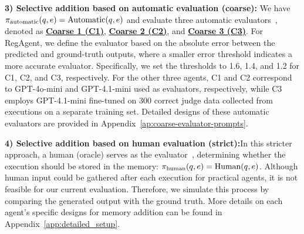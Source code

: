 \documentclass[11pt]{article}
\theoremstyle{plain}
\theoremstyle{definition}
\begin{document}
\textbf{3) Selective addition based on automatic evaluation (coarse):}
{
We have \(\pi_{\rm automatic}(q, e) = \text{Automatic}(q, e)\) and evaluate three automatic evaluators~\citep{wang2024agent,yin2024explicit,liang2024self}, denoted as \underline{\textbf{Coarse 1 (C1)}}, \underline{\textbf{Coarse 2 (C2)}}, and \underline{\textbf{Coarse 3 (C3)}}.
For RegAgent, we define the evaluator based on the absolute error between the predicted and ground-truth outputs, where a smaller error threshold indicates a more accurate evaluator.
Specifically, we set the thresholds to 1.6, 1.4, and 1.2 for C1, C2, and C3, respectively.
For the other three agents, C1 and C2 correspond to GPT-4o-mini and GPT-4.1-mini used as evaluators, respectively, while C3 employs GPT-4.1-mini fine-tuned on 300 correct judge data collected from executions on a separate training set.
}
Detailed designs of these automatic evaluators are provided in Appendix~\ref{ap:coarse-evaluator-prompts}.

\textbf{4) Selective addition based on human evaluation (strict):}In this stricter approach, a human (oracle) serves as the evaluator~\citep{shi2024ehragent}, determining whether the execution should be stored in the memory: \(\pi_{\rm human}(q, e) = \text{Human}(q, e)\). Although human input could be gathered after each execution for practical agents, it is not feasible for our current evaluation. Therefore, we simulate this process by comparing the generated output with the ground truth. More details on each agent’s specific designs for memory addition can be found in Appendix~\ref{app:detailed_setup}.
\end{document}
